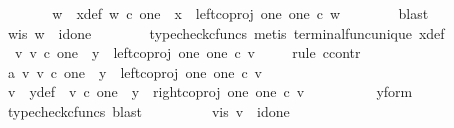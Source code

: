 \begin{isabellebody}
\ \ \ \ \isamarkupfalse%
\ \isamarkupfalse%
\ w\ \ x{\isacharunderscore}{\kern0pt}def{\isacharcolon}{\kern0pt}\ {\isachardoublequoteopen}w\ {\isasymin}\isactrlsub c\ one\ {\isasymand}\ x\ {\isacharequal}{\kern0pt}\ left{\isacharunderscore}{\kern0pt}coproj\ one\ one\ {\isasymcirc}\isactrlsub c\ w{\isachardoublequoteclose}\isanewline
\ \ \ \ \ \ \isamarkupfalse%
\ blast\isanewline
\ \ \ \ \isamarkupfalse%
\ \isamarkupfalse%
\ w{\isacharunderscore}{\kern0pt}is{\isacharcolon}{\kern0pt}\ {\isachardoublequoteopen}w\ {\isacharequal}{\kern0pt}\ id{\isacharparenleft}{\kern0pt}one{\isacharparenright}{\kern0pt}{\isachardoublequoteclose}\isanewline
\ \ \ \ \ \ \isamarkupfalse%
\ {\isacharparenleft}{\kern0pt}typecheck{\isacharunderscore}{\kern0pt}cfuncs{\isacharcomma}{\kern0pt}\ metis\ terminal{\isacharunderscore}{\kern0pt}func{\isacharunderscore}{\kern0pt}unique\ x{\isacharunderscore}{\kern0pt}def{\isacharparenright}{\kern0pt}\isanewline
\ \ \ \ \isamarkupfalse%
\ {\isachardoublequoteopen}{\isasymexists}\ v{\isachardot}{\kern0pt}\ v\ {\isasymin}\isactrlsub c\ one\ {\isasymand}\ y\ {\isacharequal}{\kern0pt}\ left{\isacharunderscore}{\kern0pt}coproj\ one\ one\ {\isasymcirc}\isactrlsub c\ v{\isachardoublequoteclose}\isanewline
\ \ \ \ \isamarkupfalse%
{\isacharparenleft}{\kern0pt}rule\ ccontr{\isacharparenright}{\kern0pt}\isanewline
\ \ \ \ \ \ \isamarkupfalse%
\ a{}{\isacharcolon}{\kern0pt}\ {\isachardoublequoteopen}{\isasymnexists}v{\isachardot}{\kern0pt}\ v\ {\isasymin}\isactrlsub c\ one\ {\isasymand}\ y\ {\isacharequal}{\kern0pt}\ left{\isacharunderscore}{\kern0pt}coproj\ one\ one\ {\isasymcirc}\isactrlsub c\ v{\isachardoublequoteclose}\isanewline
\ \ \ \ \ \ \isamarkupfalse%
\ \isamarkupfalse%
\ v\ \ y{\isacharunderscore}{\kern0pt}def{\isacharcolon}{\kern0pt}\ \ {\isachardoublequoteopen}v\ {\isasymin}\isactrlsub c\ one\ {\isasymand}\ y\ {\isacharequal}{\kern0pt}\ right{\isacharunderscore}{\kern0pt}coproj\ one\ one\ {\isasymcirc}\isactrlsub c\ v{\isachardoublequoteclose}\isanewline
\ \ \ \ \ \ \ \ \isamarkupfalse%
\ y{\isacharunderscore}{\kern0pt}form\ \isamarkupfalse%
\ {\isacharparenleft}{\kern0pt}typecheck{\isacharunderscore}{\kern0pt}cfuncs{\isacharcomma}{\kern0pt}\ blast{\isacharparenright}{\kern0pt}\isanewline
\ \ \ \ \ \ \isamarkupfalse%
\ \isamarkupfalse%
\ v{\isacharunderscore}{\kern0pt}is{\isacharcolon}{\kern0pt}\ {\isachardoublequoteopen}v\ {\isacharequal}{\kern0pt}\ id{\isacharparenleft}{\kern0pt}one{\isacharparenright}{\kern0pt}{\isachardoublequoteclose}\isanewline

\end{isabellebody}
